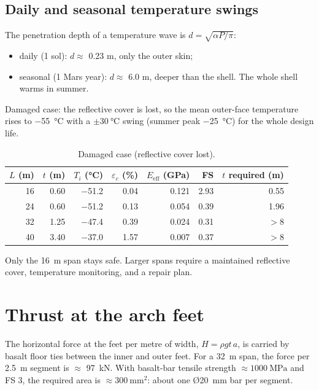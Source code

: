 \documentclass[11pt,a4paper]{article}
\begin{document}
\subsection{Daily and seasonal temperature swings}\label{sec:bad}
The penetration depth of a temperature wave is $d=\sqrt{\alpha P/\pi}$:
\begin{itemize}
\item daily (1 sol): $d\approx$ \num{0.23} \si{\metre}, only the outer skin;
\item seasonal (1 Mars year): $d\approx$ \num{6.0} \si{\metre}, deeper than the shell. The whole shell warms in summer.
\end{itemize}
Damaged case: the reflective cover is lost, so the mean outer-face temperature rises to \SI{-55}{\celsius} with a $\pm\SI{30}{\celsius}$ swing (summer peak \SI{-25}{\celsius}) for the whole design life.
\begin{table}[h]\centering\small
\caption{Damaged case (reflective cover lost).}
\begin{tabular}{rrrrrrr}\toprule
$L$ (\si{\metre}) & $t$ (\si{\metre}) & $T_i$ (\si{\celsius}) & $\varepsilon_c$ (\si{\percent}) & $E_{\text{eff}}$ (\si{\giga\pascal}) & FS & $t$ required (\si{\metre}) \\\midrule
\num{16} & \num{0.60} & \num{-51.2} & \num{0.04} & \num{0.121} & \num{2.93} & \num{0.55} \\
\num{24} & \num{0.60} & \num{-51.2} & \num{0.13} & \num{0.054} & \num{0.39} & \num{1.96} \\
\num{32} & \num{1.25} & \num{-47.4} & \num{0.39} & \num{0.024} & \num{0.31} & $>8$ \\
\num{40} & \num{3.40} & \num{-37.0} & \num{1.57} & \num{0.007} & \num{0.37} & $>8$ \\
\bottomrule\end{tabular}
\end{table}
Only the \SI{16}{\metre} span stays safe. Larger spans require a maintained reflective cover, temperature monitoring, and a repair plan.

\section{Thrust at the arch feet}
The horizontal force at the feet per metre of width, $H=\rho g t\, a$, is carried by basalt floor ties between the inner and outer feet. For a \SI{32}{\metre} span, the force per \SI{2.5}{\metre} segment is $\approx$ \SI{97}{\kilo\newton}. With basalt-bar tensile strength $\approx\SI{1000}{\mega\pascal}$ and FS 3, the required area is $\approx\SI{300}{\milli\metre\squared}$: about one \O\SI{20}{\milli\metre} bar per segment.
\end{document}
